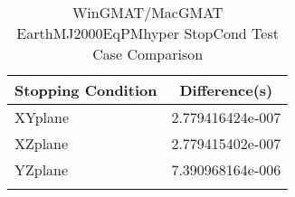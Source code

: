 \begin{table}[htbp!]
\centering
\caption{ WinGMAT/MacGMAT EarthMJ2000EqPMhyper StopCond Test Case Comparison}
      \begin{tabular}{lc}
      \hline\hline
          Stopping Condition & Difference(s) \\
         \hline
         XYplane & 2.779416424e-007 \\
         XZplane & 2.779415402e-007 \\
         YZplane & 7.390968164e-006 \\
      \hline\hline
      \label{Table: WinGMAT-MacGMAT EarthMJ2000EqPMhyper StopCond Table} 
\end{tabular}
\end{table}
